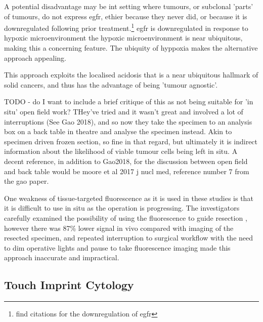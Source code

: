 


A potential disadvantage  may be int setting where tumours, or subclonal 'parts' of tumours, do not express \gls{egfr}, ethier because they never did, or because it is downregulated following prior treatment.\footnote{find citations for the downregulation of egfr}
egfr is downregulated in response to hypoxic microenvironment \cite{mayerDownregulationEGFRHypoxic2016}
the hypoxic microenvironment is near ubiquitous, making this a concerning feature.
The ubiquity of hyppoxia makes the alternative approach appealing.

This approach exploits the localised acidosis that is a near ubiquitous hallmark of solid cancers, and thus has the advantage of being 'tumour agnostic'.


TODO - do I want to include a brief critique of this as not being suitable for 'in situ' open field work? 
THey've tried and it wasn't great and involved a lot of interruptions (See Gao 2018), and so now they take the specimen to an analysis box on a back table in theatre and analyse the specimen instead. 
Akin to specimen driven frozen section, so fine in that regard, but ultimately it is indirect information about the likelihood of viable tumour cells being left in situ.
A decent reference, in addition to Gao2018, for the discussion between open field and back table would be moore et al 2017 j nucl med, reference number 7 from the gao paper.

One weakness of tissue-targeted fluorescence as it is used in these studies is that it is difficult to use in situ as the operation is progressing. 
The investigators carefully examined the possibility of using the fluorescence to guide resection \cite{mooreCharacterizingUtilityLimitations2017}, however there was 87\% lower signal in vivo compared with imaging of the resected specimen, and repeated interruption to surgical workflow with the need to dim operative lights and pause to take fluorescence imaging made this approach inaccurate and impractical. 

\subsection{Touch Imprint Cytology}

